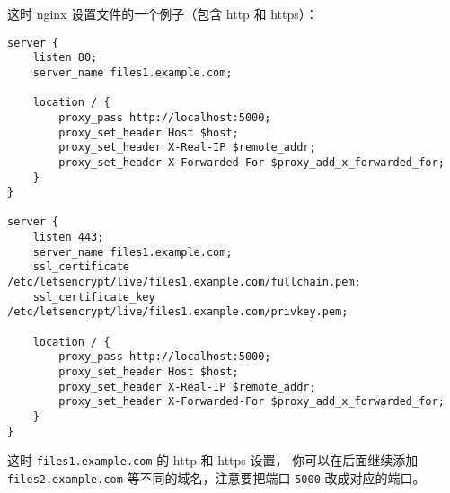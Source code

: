 这时 nginx 设置文件的一个例子（包含 http 和 https）：
\begin{lstlisting}[language=none]
server {
    listen 80;
    server_name files1.example.com;

    location / {
        proxy_pass http://localhost:5000;
        proxy_set_header Host $host;
        proxy_set_header X-Real-IP $remote_addr;
        proxy_set_header X-Forwarded-For $proxy_add_x_forwarded_for;
    }
}

server {
    listen 443;
    server_name files1.example.com;
    ssl_certificate /etc/letsencrypt/live/files1.example.com/fullchain.pem;
    ssl_certificate_key /etc/letsencrypt/live/files1.example.com/privkey.pem;

    location / {
        proxy_pass http://localhost:5000;
        proxy_set_header Host $host;
        proxy_set_header X-Real-IP $remote_addr;
        proxy_set_header X-Forwarded-For $proxy_add_x_forwarded_for;
    }
}
\end{lstlisting}
这时 \verb`files1.example.com` 的 http 和 https 设置， 你可以在后面继续添加 \verb`files2.example.com` 等不同的域名，注意要把端口 \verb`5000` 改成对应的端口。
